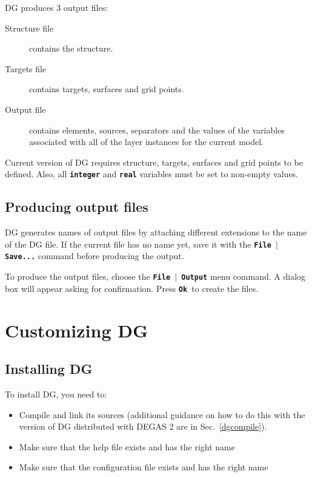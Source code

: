 \documentclass[12pt]{report}
\begin{document}
DG produces 3 output files:

\begin{description}
  \item[Structure file] contains the structure.
  \item[Targets file] contains targets, surfaces and grid
points.
  \item[Output file] contains elements, sources, separators
and the values of the variables associated with all of the
layer instances for the current model.
\end{description}

Current version of DG requires structure, targets, surfaces and grid
points to be defined. Also, all \textbf{\texttt{integer}} and
\textbf{\texttt{real}} variables must be set to non-empty values.

\section{Producing output files}

DG generates names of output files by attaching different extensions
to the name of the DG file. If the current file has no name yet, save
it with the \textbf{\texttt{File \begin{math}\vert{}\end{math} Save...}}
command before producing the output.

To produce the output files, choose the
\textbf{\texttt{File \begin{math}\vert{}\end{math} Output}} menu command.
A dialog box will appear asking for confirmation. Press
\textbf{\texttt{Ok }}to create the files.

\chapter{Customizing DG}

\section{Installing DG}

To install DG, you need to:
\begin{itemize}
  \item Compile and link its sources (additional 
guidance on how to do this with the version of DG 
distributed with DEGAS 2 are in Sec.~\ref{dgcompile}).
  \item Make sure that the help file exists and has the right name
  \item Make sure that the configuration file exists and has the right name
\end{itemize}
\end{document}

